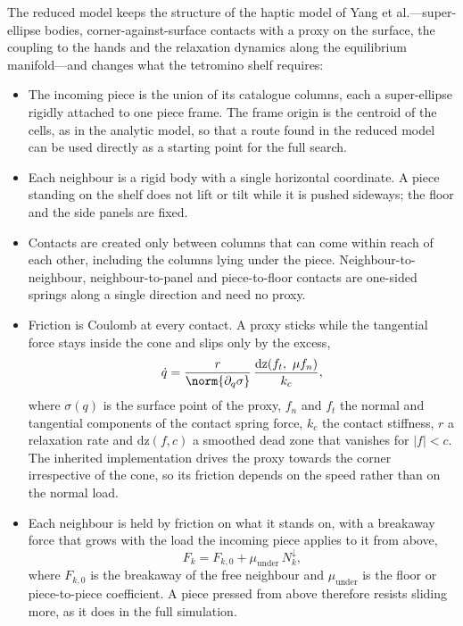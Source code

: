 The reduced model keeps the structure of the haptic model of Yang et al.---super-ellipse bodies, corner-against-surface contacts with a proxy on the surface, the coupling to the hands and the relaxation dynamics along the equilibrium manifold---and changes what the tetromino shelf requires:
\begin{itemize}
\item The incoming piece is the union of its catalogue columns, each a super-ellipse rigidly attached to one piece frame. The frame origin is the centroid of the cells, as in the analytic model, so that a route found in the reduced model can be used directly as a starting point for the full search.
\item Each neighbour is a rigid body with a single horizontal coordinate. A piece standing on the shelf does not lift or tilt while it is pushed sideways; the floor and the side panels are fixed.
\item Contacts are created only between columns that can come within reach of each other, including the columns lying under the piece. Neighbour-to-neighbour, neighbour-to-panel and piece-to-floor contacts are one-sided springs along a single direction and need no proxy.
\item Friction is Coulomb at every contact. A proxy sticks while the tangential force stays inside the cone and slips only by the excess,
\begin{equation}
\dot q=\frac{r}{\norm{\partial_q\sigma}}\,\frac{\mathrm{dz}\!\left(f_t,\ \mu f_n\right)}{k_c},
\end{equation}
where $\sigma(q)$ is the surface point of the proxy, $f_n$ and $f_t$ the normal and tangential components of the contact spring force, $k_c$ the contact stiffness, $r$ a relaxation rate and $\mathrm{dz}(f,c)$ a smoothed dead zone that vanishes for $\lvert f\rvert<c$. The inherited implementation drives the proxy towards the corner irrespective of the cone, so its friction depends on the speed rather than on the normal load.
\item Each neighbour is held by friction on what it stands on, with a breakaway force that grows with the load the incoming piece applies to it from above,
\begin{equation}
F_k=F_{k,0}+\mu_{\mathrm{under}}\,N_k^{\downarrow},
\end{equation}
where $F_{k,0}$ is the breakaway of the free neighbour and $\mu_{\mathrm{under}}$ is the floor or piece-to-piece coefficient. A piece pressed from above therefore resists sliding more, as it does in the full simulation.

\end{itemize}

